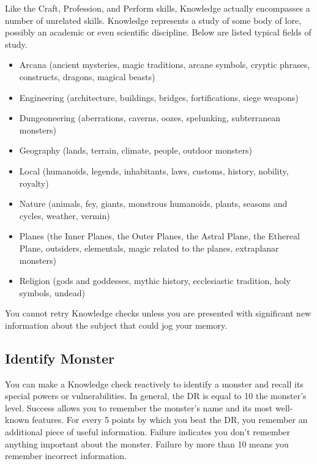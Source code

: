         Like the Craft, Profession, and Perform skills, Knowledge actually encompasses a number of unrelated skills. Knowledge represents a study of some body of lore, possibly an academic or even scientific discipline. Below are listed typical fields of study.
        \begin{itemize}
            \item Arcana (ancient mysteries, magic traditions, arcane symbols,
                cryptic phrases, constructs, dragons, magical beasts)
            \item Engineering (architecture, buildings, bridges, fortifications, siege weapons)
            \item Dungeoneering (aberrations, caverns, oozes, spelunking, subterranean monsters)
            \item Geography (lands, terrain, climate, people, outdoor monsters)
            \item Local (humanoids, legends, inhabitants, laws, customs, history, nobility, royalty)
            \item Nature (animals, fey, giants, monstrous humanoids, plants, seasons and cycles, weather, vermin)
            \item Planes (the Inner Planes, the Outer Planes, the Astral Plane,
                the Ethereal Plane, outsiders, elementals, magic related to the planes, extraplanar monsters)
            \item Religion (gods and goddesses, mythic history, ecclesiastic tradition, holy symbols, undead)
        \end{itemize}

        You cannot retry Knowledge checks unless you are presented with significant new information about the subject that could jog your memory.

    \subsection{Identify Monster}
        You can make a Knowledge check reactively to identify a monster and recall its special powers or vulnerabilities. In general, the DR is equal to 10 \add the monster's level. Success allows you to remember the monster's name and its most well-known features. For every 5 points by which you beat the DR, you remember an additional piece of useful information. Failure indicates you don't remember anything important about the monster. Failure by more than 10 means you remember incorrect information.

